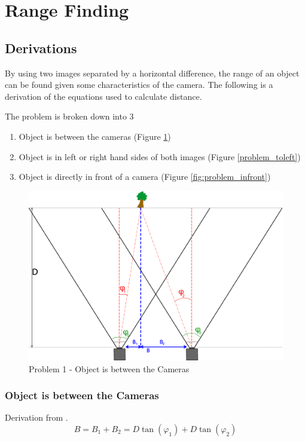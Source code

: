 \section{Range Finding}

\subsection{Derivations}

By using two images separated by a horizontal difference, the range of an object can be found given some characteristics of the camera. The following is a derivation of the equations used to calculate distance. 

The problem is broken down into 3
\begin{enumerate}
\item Object is between the cameras (Figure \ref{problem_between})
\item Object is in left or right hand sides of both images (Figure \ref{problem_toleft})
\item Object is directly in front of a camera (Figure \ref{fig:problem_infront})
\end{enumerate}

\begin{figure}
\includegraphics[width=\textwidth,height=\textheight,keepaspectratio]{Figures/problem1.png}
\caption{Problem 1 - Object is between the Cameras}
\label{problem_between}
\end{figure}

\subsubsection{Object is between the Cameras}
Derivation from \cite{Mrovlje:Distance_Stereoscopic}.
\begin{equation} \label{eq:B}
B = B_{1} + B_{2} = D\tan(\varphi_{1}) + D\tan(\varphi_{2})
\end{equation}

